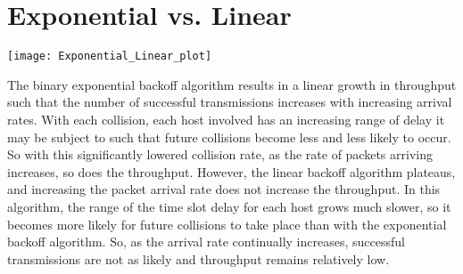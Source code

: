 \documentclass{article}
\begin{document}
\section*{Exponential vs. Linear}
\begin{center}
\texttt{[image: Exponential\_Linear\_plot]}
\end{center}
The binary exponential backoff algorithm results in a linear growth in throughput such that the number of successful transmissions increases with increasing arrival rates. With each collision, each host involved has an increasing range of delay it may be subject to such that future collisions become less and less likely to occur. So with this significantly lowered collision rate, as the rate of packets arriving increases, so does the throughput. However, the linear backoff algorithm plateaus, and increasing the packet arrival rate does not increase the throughput. In this algorithm, the range of the time slot delay for each host grows much slower, so it becomes more likely for future collisions to take place than with the exponential backoff algorithm. So, as the arrival rate continually increases, successful transmissions are not as likely and throughput remains relatively low.
\end{document}
